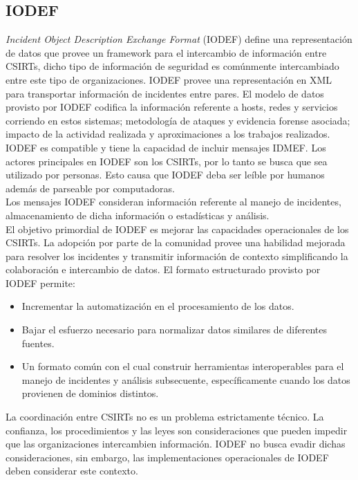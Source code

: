 \subsection{IODEF}

\textit{Incident Object Description Exchange Format} (IODEF) define una representación de datos que provee un framework para el 
intercambio de información entre CSIRTs, dicho tipo de información de seguridad 
es comúnmente intercambiado entre este tipo de organizaciones. IODEF provee una 
representación en XML para transportar información de incidentes entre pares. El modelo de datos provisto por IODEF codifica la información 
referente a hosts, redes y servicios corriendo en estos sistemas; metodología 
de ataques y evidencia forense asociada; impacto de la actividad realizada y
aproximaciones a los trabajos realizados.\\

IODEF es compatible y tiene la capacidad de incluir mensajes 
IDMEF. Los actores principales en IODEF son los CSIRTs, por lo tanto se busca que sea utilizado por personas. Esto causa que IODEF deba ser leíble por humanos además de parseable por computadoras.\\

Los mensajes IODEF consideran 
información referente al manejo de incidentes, almacenamiento de dicha 
información o estadísticas y análisis.\\

El objetivo primordial de IODEF es mejorar las capacidades operacionales de los 
CSIRTs. La adopción por parte de la comunidad provee una habilidad mejorada para 
resolver los incidentes y transmitir información de contexto simplificando la 
colaboración e intercambio de datos.
El formato estructurado provisto por IODEF permite:
\begin{itemize}
  \item Incrementar la automatización en el procesamiento de los datos.
  \item Bajar el esfuerzo necesario para normalizar datos similares de 
  diferentes fuentes.
  \item Un formato común con el cual construir herramientas interoperables para 
  el manejo de incidentes y análisis subsecuente, específicamente cuando 
  los datos provienen de dominios distintos.
\end{itemize}

La coordinación entre CSIRTs no es un problema estrictamente técnico. La 
confianza, los procedimientos y las leyes son consideraciones que pueden impedir 
que las organizaciones intercambien información. IODEF no busca evadir dichas 
consideraciones, sin embargo, las implementaciones operacionales de IODEF deben 
considerar este contexto.